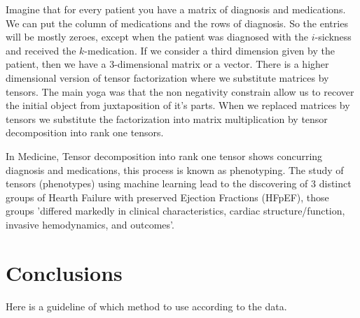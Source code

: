 \documentclass[11pt,letterpaper]{report}
\begin{document}
 

Imagine that for every patient you have a matrix of diagnosis and medications. We can put the column of medications and the rows of diagnosis. So the entries will be mostly zeroes, except when the patient was diagnosed with the $i$-sickness and received the $k$-medication. If we consider a third dimension given by the patient, then we have a 3-dimensional matrix or a vector.
 There is a higher dimensional version of tensor factorization  where we substitute  matrices by tensors. 
 The main yoga was that the non negativity constrain allow us to recover the initial object from juxtaposition of it's parts. 
 When we  replaced matrices by tensors we substitute the factorization into matrix multiplication by tensor decomposition into rank one tensors. 
 
 
In Medicine, Tensor decomposition into rank one tensor shows concurring diagnosis and medications, this process is known as phenotyping.  The study of tensors (phenotypes) using machine learning lead to the discovering of 3 distinct groups of Hearth Failure with preserved Ejection Fractions (HFpEF), those groups 'differed markedly in clinical characteristics, cardiac structure/function, invasive hemodynamics, and outcomes'.
 
 

			
		
		

	
	
	
	
	
	
	
	\chapter{Conclusions}
	Here is a guideline of which method to use according to the data.
	
\end{document}
